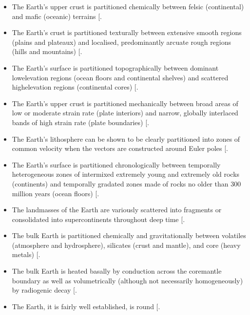 \documentclass[letterpaper,10pt,english]{jupyterBook}
\begin{document}
\begin{itemize}
\item {} 
\sphinxAtStartPar
The Earth’s upper crust is partitioned chemically between felsic (continental) and mafic (oceanic) terrains {[}\sphinxcite{references:id282}{]}.

\item {} 
\sphinxAtStartPar
The Earth’s crust is partitioned texturally between extensive smooth regions (plains and plateaux) and localised, predominantly arcuate rough regions (hills and mountains) {[}\sphinxcite{references:id281}{]}.

\item {} 
\sphinxAtStartPar
The Earth’s surface is partitioned topographically between dominant low\sphinxhyphen{}elevation regions (ocean floors and continental shelves) and scattered high\sphinxhyphen{}elevation regions (continental cores) {[}\sphinxcite{references:id474}{]}.

\item {} 
\sphinxAtStartPar
The Earth’s upper crust is partitioned mechanically between broad areas of low or moderate strain rate (plate interiors) and narrow, globally interlaced bands of high strain rate (plate boundaries) {[}\sphinxcite{references:id284}{]}.

\item {} 
\sphinxAtStartPar
The Earth’s lithosphere can be shown to be clearly partitioned into zones of common velocity when the vectors are constructed around Euler poles {[}\sphinxcite{references:id474}{]}.

\item {} 
\sphinxAtStartPar
The Earth’s surface is partitioned chronologically between temporally heterogeneous zones of intermixed extremely young and extremely old rocks (continents) and temporally gradated zones made of rocks no older than 300 million years (ocean floors) {[}\sphinxcite{references:id279}{]}.

\item {} 
\sphinxAtStartPar
The landmasses of the Earth are variously scattered into fragments or consolidated into supercontinents throughout deep time {[}\sphinxcite{references:id280}{]}.

\item {} 
\sphinxAtStartPar
The bulk Earth is partitioned chemically and gravitationally between volatiles (atmosphere and hydrosphere), silicates (crust and mantle), and core (heavy metals) {[}\sphinxcite{references:id473}{]}.

\item {} 
\sphinxAtStartPar
The bulk Earth is heated basally by conduction across the core\sphinxhyphen{}mantle boundary as well as volumetrically (although not necessarily homogeneously) by radiogenic decay {[}\sphinxcite{references:id88}{]}.

\item {} 
\sphinxAtStartPar
The Earth, it is fairly well established, is round {[}\sphinxcite{references:id285}{]}.

\end{itemize}
\end{document}
